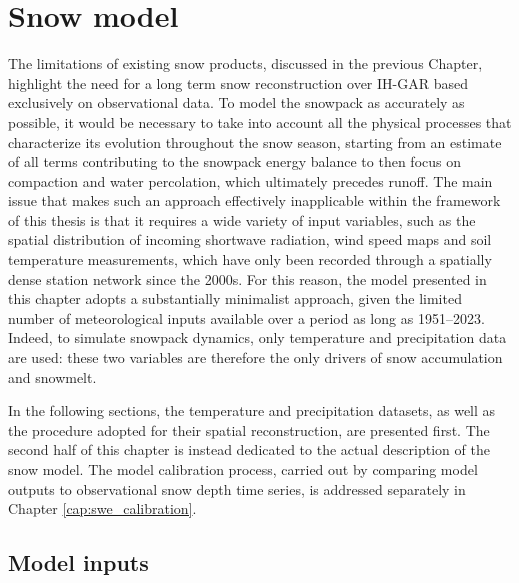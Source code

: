 \chapter{Snow model}
\label{cap:swe_model}

The limitations of existing snow products, discussed in the previous Chapter, highlight the need for a long term snow reconstruction over IH-GAR based 
exclusively on observational data. To model the snowpack as accurately as possible, 
it would be necessary to take into account all the physical processes that characterize its evolution throughout the snow season, starting from an 
estimate of all terms contributing to the snowpack energy balance to then focus on compaction and water percolation, which ultimately precedes runoff. 
The main issue that makes such an approach effectively inapplicable within the framework of this thesis is that it requires a wide variety of input 
variables, such as the spatial distribution of incoming shortwave radiation, wind speed maps and soil temperature measurements, which have only been 
recorded through a spatially dense station network since the 2000s. For this reason, the model presented in this chapter adopts a substantially 
minimalist approach, given the limited number of meteorological inputs available over a period as long as 1951--2023. Indeed, to simulate snowpack 
dynamics, only temperature and precipitation data are used: these two variables are therefore the only drivers of snow accumulation and snowmelt.

In the following sections, the temperature and precipitation datasets, as well as the procedure adopted for their spatial reconstruction, are presented 
first. The second half of this chapter is instead dedicated to the actual description of the snow model. The model calibration process, carried out 
by comparing model outputs to observational snow depth time series, is addressed separately in Chapter \ref{cap:swe_calibration}.










\section{Model inputs}

